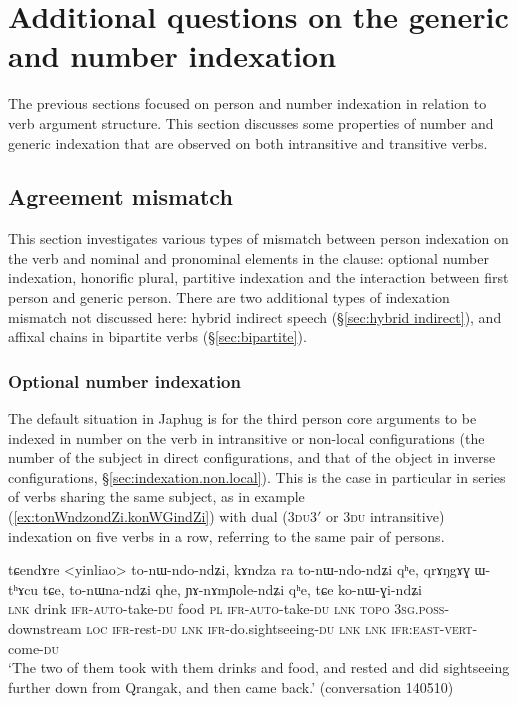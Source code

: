 \section{Additional questions on the  generic and number indexation}
The previous sections focused on person and number indexation in relation to  verb argument structure. This section discusses some properties of number and generic indexation that are observed on both intransitive and transitive verbs.

\subsection{Agreement mismatch}  \label{sec:agreement.mismatch}
This section investigates various types of mismatch between person indexation on the verb and nominal and pronominal elements in the clause: optional number indexation, honorific plural, partitive indexation and the interaction between first person and generic person. There are two additional types of indexation mismatch not discussed here: hybrid indirect speech (§\ref{sec:hybrid indirect}), and affixal chains in bipartite verbs (§\ref{sec:bipartite}).
 
\subsubsection{Optional number indexation} \label{sec:optional.indexation}
The default situation in Japhug is for the third person core arguments to be indexed in number on the verb in intransitive or non-local configurations (the number of the subject in direct configurations, and that of the object in inverse configurations, §\ref{sec:indexation.non.local}). This is the case in particular in series of verbs sharing the same subject, as in example (\ref{ex:tonWndzondZi.konWGindZi}) with dual (\textsc{3du}\fl{}3$'$ or \textsc{3du} intransitive) indexation on five verbs in a row, referring to the same pair of persons.

\begin{exe}
\ex \label{ex:tonWndzondZi.konWGindZi}
\gll tɕendɤre <yinliao> to-nɯ-ndo-ndʑi, kɤndza ra to-nɯ-ndo-ndʑi qʰe,
qrɤŋgɤɣ ɯ-tʰɤcu tɕe,  to-nɯna-ndʑi qhe, ɲɤ-nɤmɲole-ndʑi qʰe, tɕe ko-nɯ-ɣi-ndʑi \\
\textsc{lnk} drink \textsc{ifr}-\textsc{auto}-take-\textsc{du} food \textsc{pl} \textsc{ifr}-\textsc{auto}-take-\textsc{du} \textsc{lnk}  \textsc{topo} \textsc{3sg}.\textsc{poss}-downstream \textsc{loc} \textsc{ifr}-rest-\textsc{du} \textsc{lnk} \textsc{ifr}-do.sightseeing-\textsc{du} \textsc{lnk} \textsc{lnk}  \textsc{ifr}:\textsc{east}-\textsc{vert}-come-\textsc{du} \\
\glt `The two of them took with them drinks and food, and rested and did sightseeing further down from Qrangak, and then came back.' (conversation 140510)
\end{exe}


